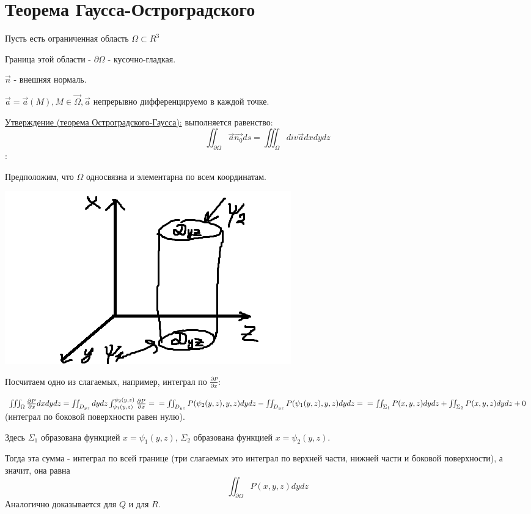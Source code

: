 \documentclass[12pt]{article}
\begin{document}
\section{Теорема Гаусса-Остроградского}
Пусть есть ограниченная область $\Omega \subset R^3$\par
Граница этой области - $\partial \Omega$ - кусочно-гладкая.\par
$\overrightarrow{n}$ - внешняя нормаль.\par
$\overrightarrow{a} = \overrightarrow{a} (M), M \in \overrightarrow{\Omega}, \overrightarrow{a}$ непрерывно дифференцируемо в каждой точке.\par
\uline{Утверждение (теорема Остроградского-Гаусса):} выполняется равенство:
$$\iint_{\partial\Omega} \overrightarrow{a} \overrightarrow{n_0} ds = \iiint_{\Omega} div \overrightarrow{a} dxdydz$$
:\par
Предположим, что $\Omega$ односвязна и элементарна по всем координатам.\par
\includegraphics{ostrogradGaussProof}\par
Посчитаем одно из слагаемых, например, интеграл по $\frac{\partial P}{\partial x}$:\par
$\iiint_\Omega \frac{\partial P}{\partial x} dxdydz = \iint_{D_{yz}} dydz \int_{\psi_1(y,z)}^{\psi_2(y,z)} \frac{\partial P}{\partial x} =\\= \iint_{D_{yz}} P(\psi_2(y,z),y,z)dydz-\iint_{D_{yz}} P(\psi_1(y,z),y,z)dydz =\\= \iint_{\Sigma_1} P(x,y,z) dydz + \iint_{\Sigma_2} P(x,y,z) dydz + 0$ (интеграл по боковой поверхности равен нулю).\par
Здесь $\Sigma_1$ образована функцией $x = \psi_1(y,z)$, $\Sigma_2$ образована функцией $x = \psi_2(y,z)$.\par
Тогда эта сумма - интеграл по всей границе (три слагаемых это интеграл по верхней части, нижней части и боковой поверхности), а значит, она равна
$$\iint_{\partial \Omega} P(x,y,z) dydz$$
Аналогично доказывается для $Q$ и для $R$.\par
\end{document}
